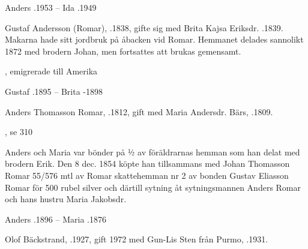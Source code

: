 Anders .1953  --  Ida .1949




Gustaf Andersson (Romar), .1838, gifte sig med Brita Kajsa Eriksdr. .1839. Makarna hade sitt jordbruk på åbacken vid Romar. Hemmanet delades sannolikt 1872 med brodern Johan, men fortsattes att brukas gemensamt.
\begin{jhchildren}
  \item {}, emigrerade till Amerika
  \item {}
  \item {}
\end{jhchildren}

Gustaf .1895  --  Brita -1898


Anders  Thomasson Romar, .1812, gift med Maria Andersdr. Bärs, .1809.
\begin{jhchildren}
  \item {}, se 310
  \item {}
  \item {}
  \item {}
  \item {}
  \item {}
  \item {}
\end{jhchildren}
Anders och Maria var bönder på ½  av föräldrarnas hemman som han delat med brodern Erik. Den 8 dec. 1854 köpte han tillsammans med Johan Thomasson Romar 55/576 mtl av Romar skattehemman nr 2 av bonden Gustav Eliasson Romar för 500 rubel silver och därtill sytning åt sytningsmannen Anders Romar och hans hustru Maria Jakobsdr.

Anders .1896  --  Maria  .1876



Olof Bäckstrand, .1927, gift 1972 med Gun-Lis Sten från Purmo, .1931.


